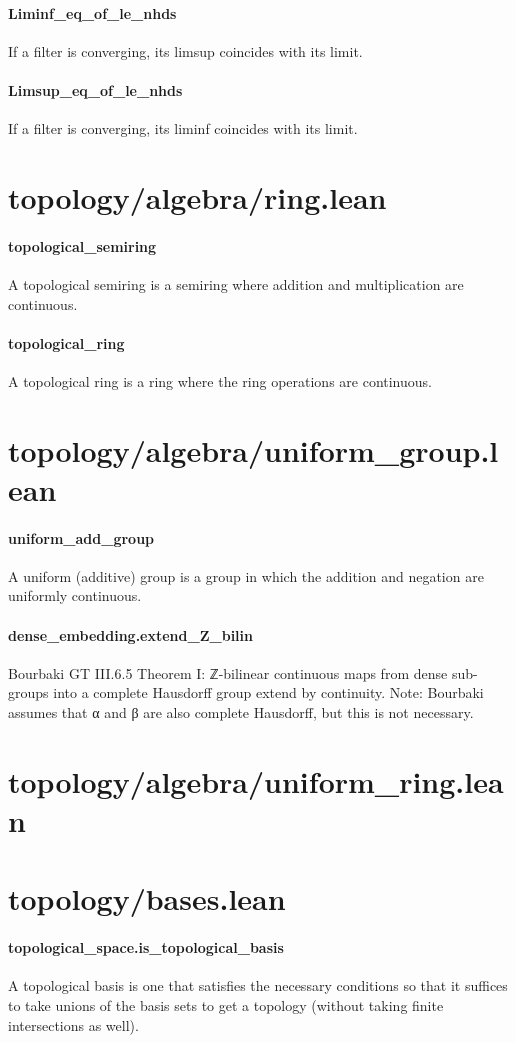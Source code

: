 \documentclass{article}
\begin{document}
\paragraph{Liminf\_eq\_of\_le\_nhds}
\par
If a filter is converging, its limsup coincides with its limit.
\paragraph{Limsup\_eq\_of\_le\_nhds}
\par
If a filter is converging, its liminf coincides with its limit.
\section{topology/algebra/ring.lean}\paragraph{topological\_semiring}
\par
A topological semiring is a semiring where addition and multiplication are continuous.
\paragraph{topological\_ring}
\par
A topological ring is a ring where the ring operations are continuous.
\section{topology/algebra/uniform\_group.lean}\paragraph{uniform\_add\_group}
\par
A uniform (additive) group is a group in which the addition and negation are
uniformly continuous.
\paragraph{dense\_embedding.extend\_Z\_bilin}
\par
Bourbaki GT III.6.5 Theorem I:
ℤ-bilinear continuous maps from dense sub-groups into a complete Hausdorff group extend by continuity.
Note: Bourbaki assumes that α and β are also complete Hausdorff, but this is not necessary.
\section{topology/algebra/uniform\_ring.lean}\section{topology/bases.lean}\paragraph{topological\_space.is\_topological\_basis}
\par
A topological basis is one that satisfies the necessary conditions so that
it suffices to take unions of the basis sets to get a topology (without taking
finite intersections as well).
\end{document}
